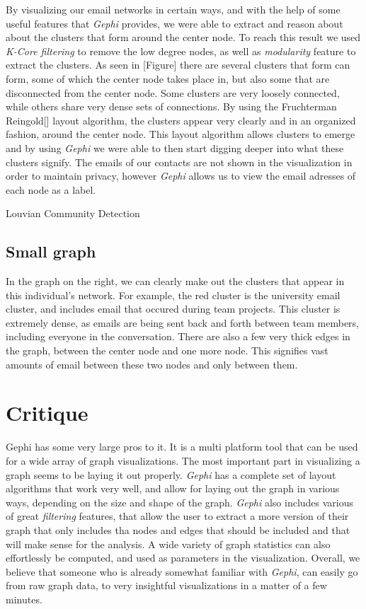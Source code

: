 \documentclass[11pt,letterpaper]{article}
\begin{document}
By visualizing our email networks in certain ways, and with the help of some useful features that \textit{Gephi} provides, we were able to extract and reason about about the clusters that form around the center node. To reach this result we used \textit{K-Core filtering} to remove the low degree nodes, as well as \textit{modularity} feature to extract the clusters. As seen in [Figure] there are several clusters that form can form, some of which the center node takes place in, but also some that are disconnected from the center node. Some clusters are very loosely connected, while others share very dense sets of connections. By using the Fruchterman Reingold[] layout algorithm, the clusters appear very clearly and in an organized fashion, around the center node. This layout algorithm allows clusters to emerge and by using \textit{Gephi} we were able to then start digging deeper into what these clusters signify. The emails of our contacts are not shown in the visualization in order to maintain privacy, however \textit{Gephi} allows us to view the email adresses of each node as a label.

Louvian Community Detection \cite{de_meo_generalized_2011}

\subsection*{Small graph}
In the graph on the right, we can clearly make out the clusters that appear in this individual's network. For example, the red cluster is the university email cluster, and includes email that occured during team projects. This cluster is extremely dense, as emails are being sent back and forth between team members, including everyone in the conversation. There are also a few very thick edges in the graph, between the center node and one more node. This signifies vast amounts of email between these two nodes and only between them.


\section*{Critique}

Gephi has some very large pros to it. It is a multi platform tool that can be used for a wide array of graph visualizations. The most important part in visualizing a graph seems to be laying it out properly. \textit{Gephi} has a complete set of layout algorithms that work very well, and allow for laying out the graph in various ways, depending on the size and shape of the graph. \textit{Gephi} also includes various of great \textit{filtering} features, that allow the user to extract a more version of their graph that only includes tha nodes and edges that should be included and that will make sense for the analysis. A wide variety of graph statistics can also effortlessly be computed, and used as parameters in the visualization. Overall, we believe that someone who is already somewhat familiar with \textit{Gephi}, can easily go from raw graph data, to very insightful visualizations in a matter of a few minutes.
\end{document}
